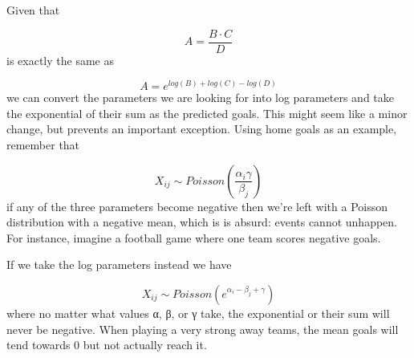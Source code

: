 \documentclass[]{article}
\begin{document}
Given that

\[ A = \frac{B \cdot C}{D}\] is exactly the same as

\[ A = e ^{log(B) + log(C) - log(D)}\] we can convert the parameters we
are looking for into log parameters and take the exponential of their
sum as the predicted goals. This might seem like a minor change, but
prevents an important exception. Using home goals as an example,
remember that

\[X_{ij} \sim Poisson(\frac{α_{i}γ}{β_{j}})\] if any of the three
parameters become negative then we're left with a Poisson distribution
with a negative mean, which is is absurd: events cannot unhappen. For
instance, imagine a football game where one team scores negative goals.

If we take the log parameters instead we have

\[X_{ij} \sim Poisson(e ^ {α_{i} - β_{j} + γ})\] where no matter what
values α, β, or γ take, the exponential or their sum will never be
negative. When playing a very strong away teams, the mean goals will
tend towards 0 but not actually reach it.
\end{document}
